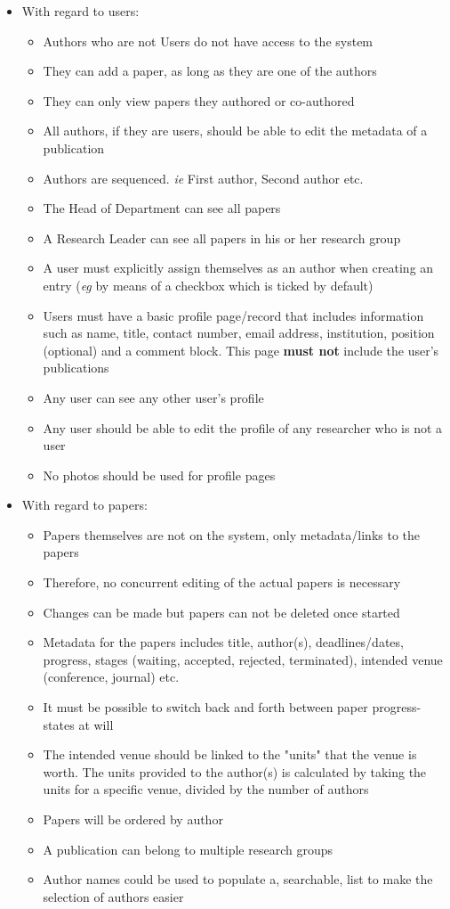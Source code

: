 \documentclass[a4paper,12pt]{article}
\begin{document}
\begin{itemize}
\item With regard to users:
\begin{itemize}
\item Authors who are not Users do not have access to the system
\item They can add a paper, as long as they are one of the authors
\item They can only view papers they authored or co-authored
\item All authors, if they are users, should be able to edit the metadata of a publication
\item Authors are sequenced. \textit{ie} First author, Second author etc.  
\item The Head of Department can see all papers
\item A Research Leader can see all papers in his or her research group
\item A user must explicitly assign themselves as an author when creating an entry (\textit{eg} by means of a checkbox which is ticked by default)
\item Users must have a basic profile page/record that includes information such as name, 
title, contact number, email address, institution, position (optional) and a comment block. This page \textbf{must not} include the user's publications
\item Any user can see any other user's profile
\item Any user should be able to edit the profile of any researcher who is not a user
\item No photos should be used for profile pages
\end{itemize}

\item With regard to papers:
\begin{itemize}
\item Papers themselves are not on the system, only metadata/links to the papers
\item Therefore, no concurrent editing of the actual papers is necessary
\item Changes can be made but papers can not be deleted once started 
\item Metadata for the papers includes title, author(s), deadlines/dates, progress, stages (waiting, accepted, rejected, terminated), intended venue (conference, journal) etc.
\item It must be possible to switch back and forth between paper progress-states at will
\item The intended venue should be linked to the "units" that the venue is worth. The units provided to the author(s) is calculated by taking the units for a specific venue, divided by the number of authors
\item Papers will be ordered by author
\item A publication can belong to multiple research groups
\item Author names could be used to populate a, searchable, list to make the selection of authors easier
\end{itemize}


\end{itemize}
\end{document}
